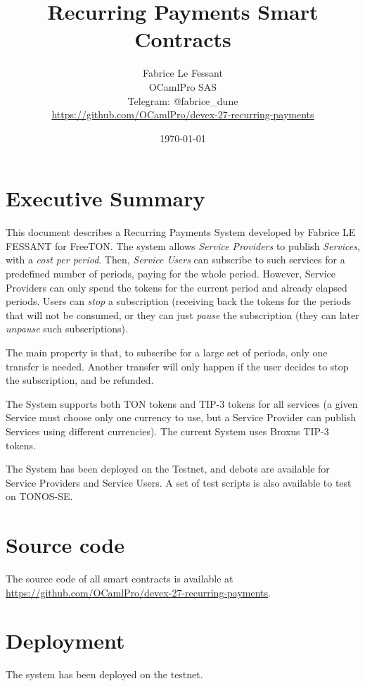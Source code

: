 \documentclass[10pt,a4paper]{article}
\author{Fabrice Le Fessant\\OCamlPro SAS\\Telegram: @fabrice\_dune\\ \small{\url{https://github.com/OCamlPro/devex-27-recurring-payments}}}
\title{Recurring Payments Smart Contracts}
\date{\today}
\begin{document}
\maketitle

\section{Executive Summary}

This document describes a Recurring Payments System developed by
Fabrice LE FESSANT for FreeTON. The system allows {\em Service
  Providers} to publish {\em Services}, with a {\em cost per
  period}. Then, {\em Service Users} can subscribe to such services
for a predefined number of periods, paying for the whole
period. However, Service Providers can only spend the tokens for the
current period and already elapsed periods. Users can {\em stop} a
subscription (receiving back the tokens for the periods that will not
be consumed, or they can just {\em pause} the subscription (they can
later {\em unpause} such subscriptions).

The main property is that, to subscribe for a large set of periods,
only one transfer is needed. Another transfer will only happen if the
user decides to stop the subscription, and be refunded.

The System supports both TON tokens and TIP-3 tokens for all services
(a given Service must choose only one currency to use, but a Service
Provider can publish Services using different currencies). The current
System uses Broxus TIP-3 tokens.

The System has been deployed on the Testnet, and debots are available
for Service Providers and Service Users. A set of test scripts is also available to test on TONOS-SE.

\tableofcontents

\section{Source code}

The source code of all smart contracts is available at
\url{https://github.com/OCamlPro/devex-27-recurring-payments}.

\section{Deployment}

The system has been deployed on the testnet.
\end{document}
